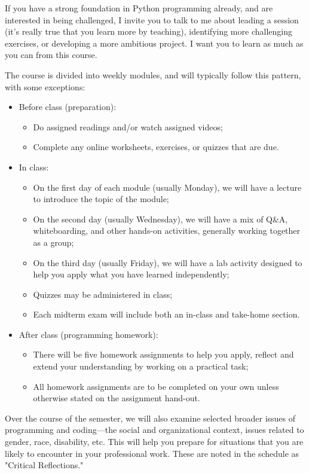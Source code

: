 \documentclass[11pt]{article}
\begin{document}
If you have a strong foundation in Python programming already, and are interested in being challenged, I invite you to talk to me about leading a session (it’s really true that you learn more by teaching), identifying more challenging exercises, or developing a more ambitious project. I want you to learn as much as you can from this course.

The course is divided into weekly modules, and will typically follow this pattern, with some exceptions:

\begin{itemize}
	\item Before class (preparation):
	\begin{itemize}
		\item Do assigned readings and/or watch assigned videos; 
		\item Complete any online worksheets, exercises, or quizzes that are due.
	\end{itemize}
	\item In class:
	\begin{itemize}
		\item On the first day of each module (usually Monday), we will have a lecture to introduce the topic of the module;
		\item On the second day (usually Wednesday), we will have a mix of Q\&A, whiteboarding, and other hands-on activities, generally working together as a group;
		\item On the third day (usually Friday), we will have a lab activity designed to help you apply what you have learned independently;
		\item Quizzes may be administered in class;
		\item Each midterm exam will include both an in-class and take-home section.
	\end{itemize}
	\item After class (programming homework):
	\begin{itemize}
		\item There will be five homework assignments to help you apply, reflect and extend your understanding by working on a practical task;
		\item	All homework assignments are to be completed on your own unless otherwise stated on the assignment hand-out.
	\end{itemize}
\end{itemize}

Over the course of the semester, we will also examine selected broader issues of programming and coding–--the social and organizational context, issues related to gender, race, disability, etc. This will help you prepare for situations that you are likely to encounter in your professional work. These are noted in the schedule as "Critical Reflections."
\end{document}
